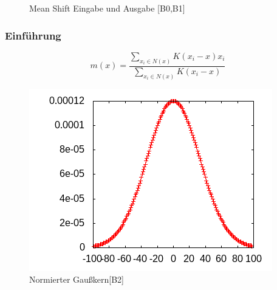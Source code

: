 \documentclass[10pt,utf8]{beamer}
\begin{document}
\begin{frame}
\begin{figure}[p!]
			\caption{Mean Shift Eingabe und Ausgabe [B0,B1]}
		\end{figure}
\end{frame}
\begin{frame}
	\frametitle{Einf\"uhrung}
 		\[ m(x) = \frac{\sum_{x_i \in N(x)} K(x_i - x) x_i }{\sum_{x_i \in N(x)} K(x_i - x)} \]
\begin{figure}
    \begin{columns}%
        \begin{column}{0.5\textwidth}%
	  \includegraphics[scale=0.7]{../output/pics/gauss.png}
        \end{column}%
        \begin{column}{0.7\textwidth}%
			\vspace{-10pt}
			\hspace{35pt}
		\caption{Normierter Gaußkern[B2]}
        \end{column}%
    \end{columns}
\end{figure}
\end{frame}
\end{document}
